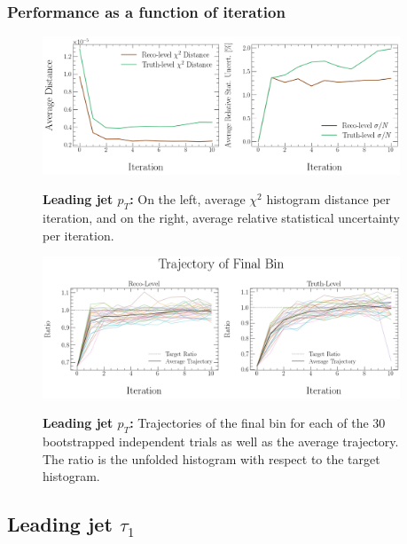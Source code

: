 \subsubsection{Performance as a function of iteration}
\begin{figure}[h]
\centering
\includegraphics[width=0.95\textwidth]{figures/num_iterations_study/pT_trackj1/iteration_study_30x10-distances-and-stat-uncert.png}\\
\caption{\textbf{Leading jet $p_T$:} On the left, average $\chi^2$ histogram distance per iteration, and on the right, average relative statistical uncertainty per iteration.}
\label{fig:num_iterations:pT_distances_stat_uncert}
\end{figure}
\begin{figure}[h]
\centering
\includegraphics[width=0.95\textwidth]{figures/num_iterations_study/pT_trackj1/iteration_study_30x10-final_bin.png}\\
\caption{\textbf{Leading jet $p_T$:} Trajectories of the final bin for each of the 30 bootstrapped independent trials as well as the average trajectory. The ratio is the unfolded histogram with respect to the target histogram.}
\label{fig:num_iterations:pT_final_bin}
\end{figure}
\clearpage 

\subsection{Leading jet $\tau_1$}
